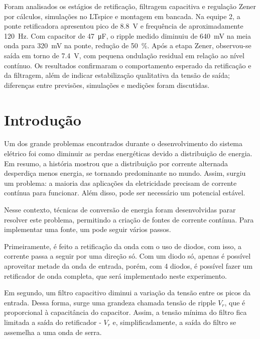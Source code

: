 \documentclass[11pt,a4paper]{article}
\begin{document}
\capa

\begin{resumo}
Foram analisados os estágios de retificação, filtragem capacitiva e regulação Zener por cálculos, simulações no LTspice e montagem em bancada. Na equipe 2, a ponte retificadora apresentou pico de \SI{8,8}{\volt} e frequência de aproximadamente \SI{120}{\hertz}. Com capacitor de \SI{47}{\micro\farad}, o ripple medido diminuiu de \SI{640}{\milli\volt} na meia onda para \SI{320}{\milli\volt} na ponte, redução de \SI{50}{\percent}. Após a etapa Zener, observou-se saída em torno de \SI{7,4}{\volt}, com pequena ondulação residual em relação ao nível contínuo. Os resultados confirmaram o comportamento esperado da retificação e da filtragem, além de indicar estabilização qualitativa da tensão de saída; diferenças entre previsões, simulações e medições foram discutidas.
\end{resumo}

\section{Introdução}

Um dos grande problemas encontrados durante o desenvolvimento do sistema elétrico foi
como diminuir as perdas energéticas devido a distribuição de energia. Em resumo, a história
mostrou que a distribuição por corrente alternada desperdiça menos energia, se tornando
predominante no mundo. Assim, surgiu um problema: a maioria das aplicações da eletricidade
precisam de corrente contínua para funcionar. Além disso, pode ser necessário um potencial
estável.

Nesse contexto, técnicas de conversão de energia foram desenvolvidas parar resolver este problema,
permitindo a criação de fontes de corrente contínua. Para implementar uma fonte, um pode seguir
vários passos.

Primeiramente, é feito a retificação da onda com o uso de diodos, com isso, a
corrente passa a seguir por uma direção só. Com um diodo só, apenas é possível aproveitar
metade da onda de entrada, porém, com 4 diodos, é possível fazer um retificador de onda completa,
que será implementado neste experimento.

Em segundo, um filtro capacitivo diminui a variação da tensão entre os picos da entrada.
Dessa forma, surge uma grandeza chamada tensão de ripple $V_r$, que é proporcional à capacitância
do capacitor. Assim, a tensão mínima do filtro fica limitada a saída do retificador - $V_r$ e,
simplificadamente, a saída do filtro se assemelha a uma onda de serra.
\end{document}
